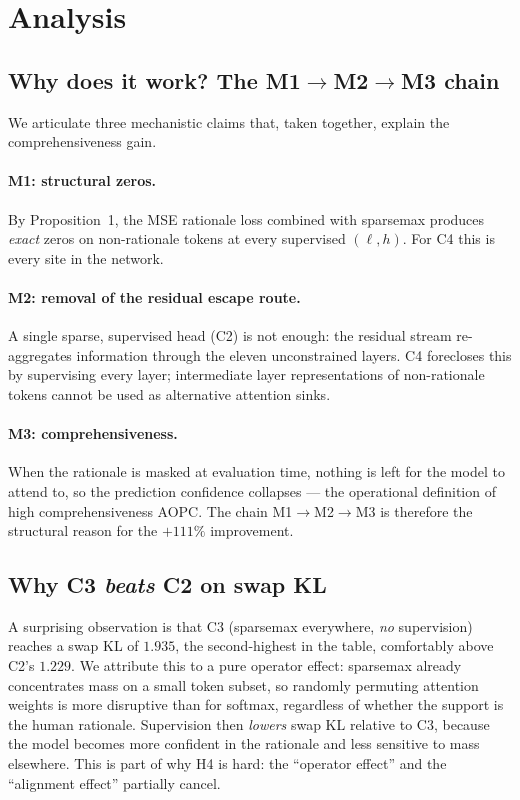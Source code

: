 \documentclass{article}
\begin{document}
\section{Analysis}
\label{sec:analysis}

\subsection{Why does it work? The M1$\to$M2$\to$M3 chain}
We articulate three mechanistic claims that, taken together, explain the
comprehensiveness gain.

\paragraph{M1: structural zeros.} By Proposition~1, the MSE rationale loss combined with
sparsemax produces \emph{exact} zeros on non-rationale tokens at every supervised
$(\ell,h)$. For C4 this is every site in the network.

\paragraph{M2: removal of the residual escape route.} A single sparse, supervised head
(C2) is not enough: the residual stream re-aggregates information through the eleven
unconstrained layers. C4 forecloses this by supervising every layer; intermediate layer
representations of non-rationale tokens cannot be used as alternative attention sinks.

\paragraph{M3: comprehensiveness.} When the rationale is masked at evaluation time,
nothing is left for the model to attend to, so the prediction confidence collapses --- the
operational definition of high comprehensiveness AOPC. The chain M1$\to$M2$\to$M3 is
therefore the structural reason for the $+111\%$ improvement.

\subsection{Why C3 \emph{beats} C2 on swap KL}
A surprising observation is that C3 (sparsemax everywhere, \emph{no} supervision) reaches
a swap KL of $1.935$, the second-highest in the table, comfortably above C2's $1.229$.
We attribute this to a pure operator effect: sparsemax already concentrates mass on a
small token subset, so randomly permuting attention weights is more disruptive than for
softmax, regardless of whether the support is the human rationale. Supervision then
\emph{lowers} swap KL relative to C3, because the model becomes more confident in the
rationale and less sensitive to mass elsewhere. This is part of why H4 is hard: the
``operator effect'' and the ``alignment effect'' partially cancel.
\end{document}
